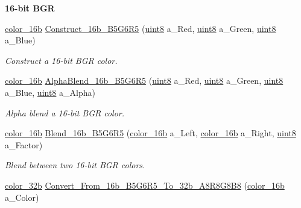 \begin{Indent}{\bf 16-\/bit BGR}\par
\begin{DoxyCompactItemize}
\item 
\hyperlink{namespacetil_a952afde951048a62d0f970dc6ca89a45}{color\_\-16b} \hyperlink{namespacetil_accd82fcffbc0f256c971beb941ab9166}{Construct\_\-16b\_\-B5G6R5} (\hyperlink{namespacetil_a7a75b0e7e2cd3f19ea51c8c02fd242f8}{uint8} a\_\-Red, \hyperlink{namespacetil_a7a75b0e7e2cd3f19ea51c8c02fd242f8}{uint8} a\_\-Green, \hyperlink{namespacetil_a7a75b0e7e2cd3f19ea51c8c02fd242f8}{uint8} a\_\-Blue)
\begin{DoxyCompactList}\small\item\em Construct a 16-\/bit BGR color. \item\end{DoxyCompactList}\item 
\hyperlink{namespacetil_a952afde951048a62d0f970dc6ca89a45}{color\_\-16b} \hyperlink{namespacetil_af5e790af48ce0da5bd73f41830705e1a}{AlphaBlend\_\-16b\_\-B5G6R5} (\hyperlink{namespacetil_a7a75b0e7e2cd3f19ea51c8c02fd242f8}{uint8} a\_\-Red, \hyperlink{namespacetil_a7a75b0e7e2cd3f19ea51c8c02fd242f8}{uint8} a\_\-Green, \hyperlink{namespacetil_a7a75b0e7e2cd3f19ea51c8c02fd242f8}{uint8} a\_\-Blue, \hyperlink{namespacetil_a7a75b0e7e2cd3f19ea51c8c02fd242f8}{uint8} a\_\-Alpha)
\begin{DoxyCompactList}\small\item\em Alpha blend a 16-\/bit BGR color. \item\end{DoxyCompactList}\item 
\hyperlink{namespacetil_a952afde951048a62d0f970dc6ca89a45}{color\_\-16b} \hyperlink{namespacetil_a7db23332b0b6b0922c591645e418d3f1}{Blend\_\-16b\_\-B5G6R5} (\hyperlink{namespacetil_a952afde951048a62d0f970dc6ca89a45}{color\_\-16b} a\_\-Left, \hyperlink{namespacetil_a952afde951048a62d0f970dc6ca89a45}{color\_\-16b} a\_\-Right, \hyperlink{namespacetil_a7a75b0e7e2cd3f19ea51c8c02fd242f8}{uint8} a\_\-Factor)
\begin{DoxyCompactList}\small\item\em Blend between two 16-\/bit BGR colors. \item\end{DoxyCompactList}\item 
\hyperlink{namespacetil_a8eb2d871b8a6ffb55b3eeb720207a6cb}{color\_\-32b} \hyperlink{namespacetil_ae0e2e24eaa0772d2ca196be6cf18b2b8}{Convert\_\-From\_\-16b\_\-B5G6R5\_\-To\_\-32b\_\-A8R8G8B8} (\hyperlink{namespacetil_a952afde951048a62d0f970dc6ca89a45}{color\_\-16b} a\_\-Color)

\end{DoxyCompactItemize}
\end{Indent}
